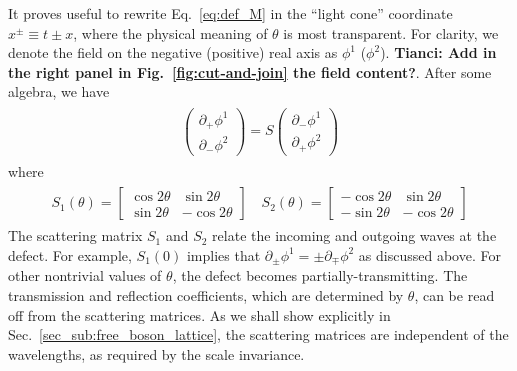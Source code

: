 It proves useful to rewrite Eq.~\eqref{eq:def_M} in the ``light cone'' coordinate $x^\pm\equiv t\pm x$, where the physical meaning of $\theta$ is most transparent. For clarity, we denote the field on the negative (positive) real axis as $\phi^1$ ($\phi^2$). {\bf\color{red}Tianci: Add in the right panel in Fig.~\ref{fig:cut-and-join} the field content?}. After some algebra, we have
\begin{eqnarray}\begin{aligned}
\label{eq:def_S}
\begin{pmatrix}
\partial_+\phi^1\\
\partial_-\phi^2
\end{pmatrix}
=S
\begin{pmatrix}
\partial_-\phi^1\\
\partial_+\phi^2
\end{pmatrix}
\end{aligned}\end{eqnarray}
where 
\begin{eqnarray}\begin{aligned}
\label{eq:S1_S2}
S_1(\theta)=\begin{bmatrix}
\cos 2\theta & \sin 2\theta \\
\sin 2\theta & -\cos 2\theta
\end{bmatrix}\quad
S_2(\theta)=\begin{bmatrix}
-\cos 2\theta & \sin 2\theta \\
-\sin 2\theta & -\cos 2\theta
\end{bmatrix}
\end{aligned}\end{eqnarray}
The scattering matrix $S_1$ and $S_2$ relate the incoming and outgoing waves at the defect. For example, $S_1(0)$ implies that $\partial_\pm\phi^{1}=\pm\partial_\mp\phi^{2}$ as discussed above. For other nontrivial values of $\theta$, the defect becomes partially-transmitting. The transmission and reflection coefficients, which are determined by $\theta$, can be read off from the scattering matrices. As we shall show explicitly in Sec.~\ref{sec_sub:free_boson_lattice}, the scattering matrices are independent of the wavelengths, as required by the scale invariance.

